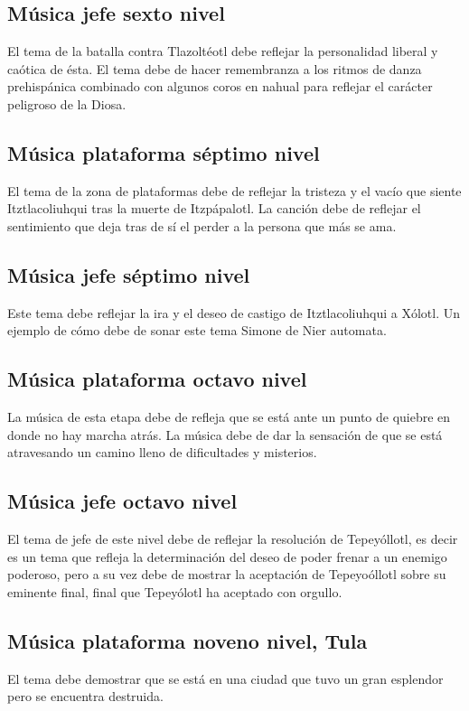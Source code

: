\subsection{Música jefe sexto nivel} \label{Musica:N06_ZN02}
El tema de la batalla contra Tlazoltéotl debe reflejar la personalidad liberal y caótica de ésta. El tema debe de hacer remembranza a los ritmos de danza prehispánica combinado con algunos coros en nahual para reflejar el carácter peligroso de la Diosa. 

\subsection{Música plataforma séptimo nivel} \label{Musica:N07_ZN01}
El tema de la zona de plataformas debe de reflejar la tristeza y el vacío que siente Itztlacoliuhqui tras la muerte de Itzpápalotl. La canción debe de reflejar el sentimiento que deja tras de sí el perder a la persona que más se ama.

\subsection{Música jefe séptimo nivel} \label{Musica:N07_ZN02}
Este tema debe reflejar la ira y el deseo de castigo de Itztlacoliuhqui a Xólotl. Un  ejemplo de cómo debe de sonar este tema Simone de Nier automata.

\subsection{Música plataforma octavo nivel} \label{Musica:N08_ZN01}
La música de esta etapa debe de refleja que se está ante un punto de quiebre en donde no hay marcha atrás. La música debe de dar la sensación de que se está atravesando un camino lleno de dificultades y misterios.

\subsection{Música jefe octavo nivel} \label{Musica:N08_ZN02}
El tema de jefe de este nivel debe de reflejar la resolución de Tepeyóllotl, es decir es un tema que refleja la determinación del deseo de poder frenar a un enemigo poderoso, pero a su vez debe de mostrar la aceptación de Tepeyoóllotl sobre su eminente final, final que Tepeyólotl ha aceptado con orgullo.

\subsection{Música plataforma noveno nivel, Tula} \label{Musica:N09_ZN01T}
El tema debe demostrar que se está en una ciudad que tuvo un gran esplendor pero se encuentra destruida.

